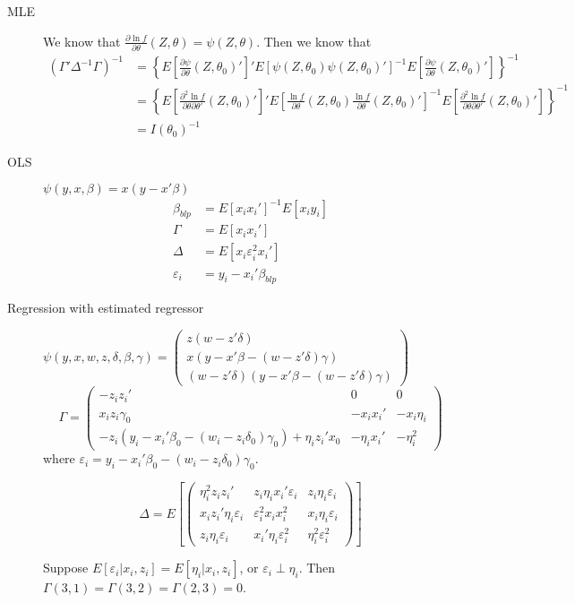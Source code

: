 \documentclass[11pt, a4paper, oneside]{article}
\theoremstyle{definition}
\theoremstyle{proposition}
\theoremstyle{corollary}
\theoremstyle{lemma}
\theoremstyle{theorem}
\begin{document}
\begin{description}
\item[MLE] We know that $\frac{\partial \ln{f}}{\partial \theta}(Z, \theta) = \psi(Z, \theta)$. Then we know that
\begin{align*}
(\Gamma'\Delta^{-1}\Gamma)^{-1} &= \left\{E\left[\frac{\partial \psi}{\partial \theta}(Z, \theta_0)'\right]'E[\psi(Z, \theta_0)\psi(Z, \theta_0)']^{-1} E\left[\frac{\partial \psi}{\partial \theta}(Z, \theta_0)'\right]\right\}^{-1}\\
&= \left\{E\left[\frac{\partial^2 \ln{f}}{\partial \theta\partial \theta'}(Z, \theta_0)'\right]'E\left[\frac{\ln{f}}{\partial \theta}(Z, \theta_0)\frac{\ln{f}}{\partial \theta}(Z, \theta_0)'\right]^{-1} E\left[\frac{\partial^2 \ln{f}}{\partial \theta\partial \theta'}(Z, \theta_0)'\right]\right\}^{-1}\\
&=I(\theta_0)^{-1}
\end{align*}
\item[OLS] $\psi(y, x, \beta) = x(y-x'\beta)$
\begin{align*}
\beta_{blp}&=E[x_ix_i']^{-1}E[x_iy_i]\\
\Gamma&=E[x_ix_i'] \\
\Delta &=E[x_i\varepsilon_i^2x_i']\\
\varepsilon_i &= y_i - x_i'\beta_{blp}
\end{align*}
\item[Regression with estimated regressor] $\psi(y, x, w, z, \delta, \beta, \gamma) = \begin{pmatrix} z(w-z'\delta)\\ x(y-x'\beta-(w-z'\delta)\gamma)\\ (w-z'\delta)(y-x'\beta-(w-z'\delta)\gamma)\end{pmatrix}$
$$\Gamma = \begin{pmatrix}
-z_iz_i' & 0& 0\\ 
x_iz_i\gamma_0 & -x_ix_i'& -x_i\eta_i\\
-z_i(y_i-x_i'\beta_0-(w_i-z_i\delta_0)\gamma_0)+\eta_iz_i'x_0 & -\eta_ix_i' & -\eta_i^2
\end{pmatrix}$$
where $\varepsilon_i = y_i-x_i'\beta_0-(w_i-z_i\delta_0)\gamma_0$. 

$$\Delta = E\left[\begin{pmatrix}
\eta_i^2z_iz_i' & z_i\eta_ix_i'\varepsilon_i & z_i\eta_i\varepsilon_i \\
x_iz_i'\eta_i\varepsilon_i & \varepsilon_i^2x_ix_i^2 & x_i\eta_i\varepsilon_i \\
z_i\eta_i\varepsilon_i & x_i'\eta_i\varepsilon_i^2 & \eta_i^2\varepsilon_i^2
\end{pmatrix}\right]$$

Suppose $E[\varepsilon_i|x_i, z_i] = E[\eta_i|x_i, z_i]$, or $\varepsilon_i\perp \eta_i$. Then $\Gamma(3, 1) = \Gamma(3, 2) = \Gamma(2, 3) = 0$. 
\end{description}
\end{document}
